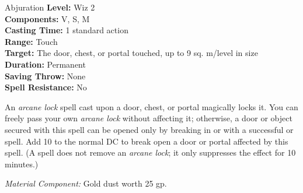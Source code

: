 {Abjuration}
{
	\textbf{Level:}
	Wiz 2\\
	\textbf{Components:}
	V, S, M\\
	\textbf{Casting Time:}
	1 standard action\\
	\textbf{Range:}
	Touch\\
	\textbf{Target:}
	The door, chest, or portal touched, up to 9 sq. m/level in size\\
	\textbf{Duration:}
	Permanent\\
	\textbf{Saving Throw:}
	None\\
	\textbf{Spell Resistance:}
	No\\
}
{
	An \emph{arcane lock} spell cast upon a door, chest, or portal magically locks it. You can freely pass your own \emph{arcane lock} without affecting it; otherwise, a door or object secured with this spell can be opened only by breaking in or with a successful  or  spell. Add 10 to the normal DC to break open a door or portal affected by this spell. (A  spell does not remove an \emph{arcane lock}; it only suppresses the effect for 10 minutes.)

	\textit{Material Component:}
	Gold dust worth 25 gp.

}
